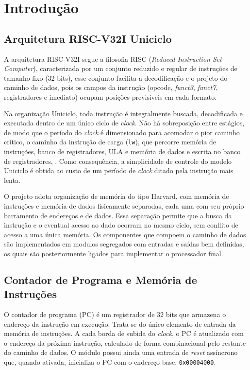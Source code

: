 \documentclass[conference]{IEEEtran}
\begin{document}
\section{Introdução}

\subsection{Arquitetura RISC-V32I Uniciclo}
A arquitetura RISC-V32I segue a filosofia RISC (\textit{Reduced Instruction Set Computer}), caracterizada
por um conjunto reduzido e regular de instruções de tamanho fixo (32 bits), esse conjunto facilita 
a decodificação e o projeto do caminho de dados, pois os campos da instrução 
(opcode, \textit{funct3}, \textit{funct7},
registradores e imediato) ocupam posições previsíveis em cada formato.

Na organização Uniciclo, toda instrução é integralmente buscada, decodificada e executada dentro de um
único ciclo de \textit{clock}. Não há sobreposição entre estágios, de modo que o período do \textit{clock}
é dimensionado para acomodar o pior caminho crítico, o caminho da instrução de carga
(\texttt{lw}), que percorre memória de instruções, banco de registradores, ULA e memória de dados e
escrita no banco de registradores, \cite{patterson2020computer}. Como consequência, a simplicidade 
de controle do modelo Uniciclo é obtida ao custo de um período de \textit{clock} 
ditado pela instrução mais lenta.

O projeto adota organização de memória do tipo Harvard, com memória de instruções e memória de dados
fisicamente separadas, cada uma com seu próprio barramento de endereços e de dados. Essa separação permite
que a busca da instrução e o eventual acesso ao dado ocorram no mesmo ciclo, sem conflito de acesso a uma
única memória. Os componentes que compoem o caminho de dados são implementados em modulos segregados com
entradas e saídas bem definidas, os quais são posteriormente ligados para implementar o processador final.

\subsection{Contador de Programa e Memória de Instruções}
O contador de programa (PC) é um registrador de 32 bits que armazena o endereço da instrução em execução.
Trata-se do único elemento de entrada da memória de instruções. A cada borda de subida do \textit{clock}, 
o PC é atualizado com o endereço da próxima instrução, calculado de forma combinacional 
pelo restante do caminho de dados. O módulo possui ainda uma entrada de \textit{reset} 
assíncrono que, quando ativada, inicializa o PC com o endereço base, \texttt{0x00004000}.
\end{document}
